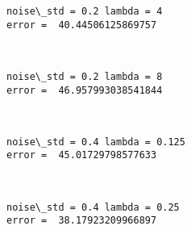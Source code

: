 \documentclass[11pt]{article}
\begin{document}
    \begin{Verbatim}[commandchars=\\\{\}]
noise\_std = 0.2 lambda = 4
error =  40.44506125869757

    \end{Verbatim}

    \begin{center}
    \end{center}
    { \hspace*{\fill} \\}
    
    \begin{Verbatim}[commandchars=\\\{\}]
noise\_std = 0.2 lambda = 8
error =  46.957993038541844

    \end{Verbatim}

    \begin{center}
    \end{center}
    { \hspace*{\fill} \\}
    
    \begin{Verbatim}[commandchars=\\\{\}]
noise\_std = 0.4 lambda = 0.125
error =  45.01729798577633

    \end{Verbatim}

    \begin{center}
    \end{center}
    { \hspace*{\fill} \\}
    
    \begin{Verbatim}[commandchars=\\\{\}]
noise\_std = 0.4 lambda = 0.25
error =  38.17923209966897

    \end{Verbatim}

    \begin{center}
    \end{center}
    { \hspace*{\fill} \\}
    
\end{document}
